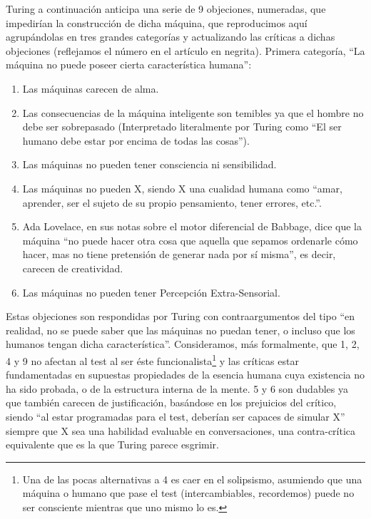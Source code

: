 \documentclass[12pt]{memoir}
\begin{document}
Turing a continuación anticipa una serie de 9 objeciones, numeradas, que impedirían la construcción de dicha máquina, que reproducimos aquí agrupándolas en tres grandes categorías y actualizando las críticas a dichas objeciones (reflejamos el número en el artículo en negrita). Primera categoría, ``La máquina no puede poseer cierta característica humana'': 

\begin{enumerate}
    \item[\textbf{1}] Las máquinas carecen de alma.
    \item[\textbf{2}] Las consecuencias de la máquina inteligente son temibles ya que el hombre no debe ser sobrepasado (Interpretado literalmente por Turing como ``El ser humano debe estar por encima de todas las cosas'').
    \item[\textbf{4}] Las máquinas no pueden tener consciencia ni sensibilidad.
    \item[\textbf{5}] Las máquinas no pueden X, siendo X una cualidad humana como ``amar, aprender, ser el sujeto de su propio pensamiento, tener errores, etc.''.
    \item[\textbf{6}] Ada Lovelace, en sus notas sobre el motor diferencial de Babbage, dice que la máquina ``no puede hacer otra cosa que aquella que sepamos ordenarle cómo hacer, mas no tiene pretensión de generar nada por sí misma'', es decir, carecen de creatividad.
    \item[\textbf{9}] Las máquinas no pueden tener Percepción Extra-Sensorial.
\end{enumerate}

Estas objeciones son respondidas por Turing con contraargumentos del tipo ``en realidad, no se puede saber que las máquinas no puedan tener, o incluso que los humanos tengan dicha característica''. Consideramos, más formalmente, que 1, 2, 4 y 9 no afectan al test al ser éste funcionalista\footnote{Una de las pocas alternativas a 4 es caer en el solipsismo, asumiendo que una máquina o humano que pase el test (intercambiables, recordemos) puede no ser consciente mientras que uno mismo lo es.} y las críticas estar fundamentadas en supuestas propiedades de la esencia humana cuya existencia no ha sido probada, o de la estructura interna de la mente. 5 y 6 son dudables ya que también carecen de justificación, basándose en los prejuicios del crítico, siendo ``al estar programadas para el test, deberían ser capaces de simular X'' siempre que X sea una habilidad evaluable en conversaciones, una contra-crítica equivalente que es la que Turing parece esgrimir.
\end{document}
